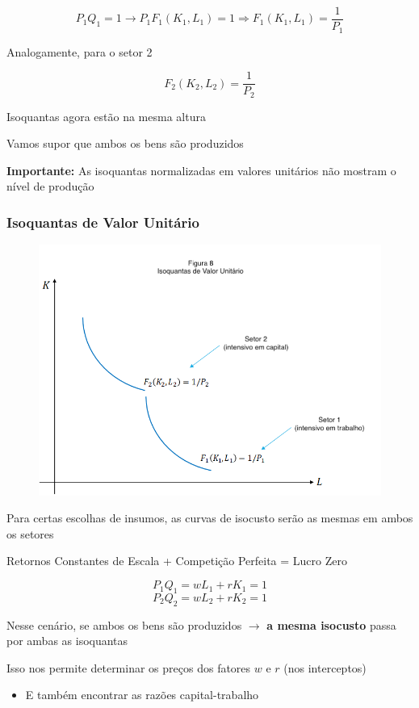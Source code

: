 \documentclass[a4paper,12pt]{article}[abntex2]
\begin{document}
\[
P_1 Q_1 = 1 \rightarrow P_1 F_1(K_1, L_1) = 1 \Rightarrow F_1(K_1, L_1) = \frac{1}{P_1}
\]

Analogamente, para o setor 2

\[
F_2(K_2, L_2) = \frac{1}{P_2}
\]

Isoquantas agora estão na mesma altura

Vamos supor que ambos os bens são produzidos

\textbf{Importante:} As isoquantas normalizadas em valores unitários não mostram o nível de produção

\subsubsection{\textbf{Isoquantas de Valor Unitário}}
\begin{figure}[H]
    \centering
    \includegraphics[width=0.7\linewidth]{Imagens/a10i8.png}
\end{figure}

Para certas escolhas de insumos, as curvas de isocusto serão as mesmas em ambos os setores

Retornos Constantes de Escala + Competição Perfeita = Lucro Zero

\[
P_1 Q_1 = wL_1 + rK_1 = 1
\]
\[
P_2 Q_2 = wL_2 + rK_2 = 1
\]

Nesse cenário, se ambos os bens são produzidos \(\rightarrow\) \textbf{a mesma isocusto} passa por ambas as isoquantas

Isso nos permite determinar os preços dos fatores \(w\) e \(r\) (nos interceptos)

\begin{itemize}
    \item E também encontrar as razões capital-trabalho
\end{itemize}
\end{document}
